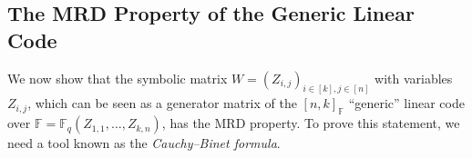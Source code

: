 \documentclass[11pt]{article}
\newif\ifmynotes
\newcommand{\ZGnote}[1]{\ifmynotes\textcolor{purple}{[Zeyu: #1]}\else\fi}
\newcommand{\CYnote}[1]{\ifmynotes\textcolor{orange}{[Chen: #1]}\else\fi}
\theoremstyle{plain}
\theoremstyle{definition}
\theoremstyle{remark}
\newcommand{\F}{\mathbb{F}}
\newcommand{\spa}{\mathrm{span}}
\newcommand{\be}{\bm{e}}
\def \mG {\mathcal{G}}
\begin{document}

\subsection{The MRD Property of the Generic Linear Code}

We now show that the symbolic matrix $W=(Z_{i,j})_{i\in [k], j\in [n]}$ with variables $Z_{i,j}$, which can be seen as a generator matrix of the $[n,k]_\F$ ``generic'' linear code over $\F=\F_q(Z_{1,1},\dots,Z_{k,n})$, has the MRD property. To prove this statement, we need a tool known as the \emph{Cauchy--Binet formula}.

\end{document}
